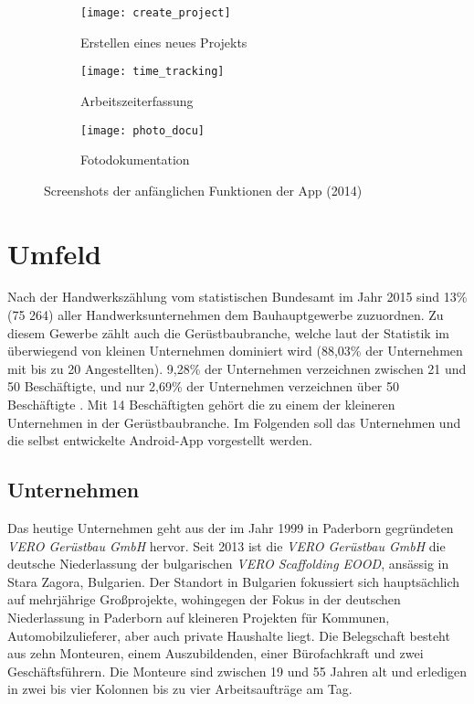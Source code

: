\begin{figure}[h]
  \centering
  \begin{subfigure}[t]{0.3\textwidth}
    \texttt{[image: create\_project]}
    \caption{Erstellen eines neues Projekts}
  \end{subfigure}
  \begin{subfigure}[t]{0.3\textwidth}
    \texttt{[image: time\_tracking]}
    \caption{Arbeitszeiterfassung}
  \end{subfigure}
  \begin{subfigure}[t]{0.3\textwidth}
    \texttt{[image: photo\_docu]}
    \caption{Fotodokumentation}
  \end{subfigure}
  \caption{Screenshots der anfänglichen Funktionen der App (2014)}
  \label{fig:app14}
\end{figure}

\section{Umfeld}
Nach der Handwerkszählung vom statistischen Bundesamt im Jahr 2015 sind 13\% (75 264) aller Handwerksunternehmen dem Bauhauptgewerbe zuzuordnen.
Zu diesem Gewerbe zählt auch die Gerüstbaubranche, welche laut der Statistik im überwiegend von kleinen Unternehmen dominiert wird (88,03\% der Unternehmen mit bis zu 20 Angestellten). 
9,28\% der Unternehmen verzeichnen zwischen 21 und 50 Beschäftigte, und nur 2,69\% der Unternehmen verzeichnen über 50 Beschäftigte \citep{HZ17}.
Mit 14 Beschäftigten gehört die \vr{} zu einem der kleineren Unternehmen in der Gerüstbaubranche.
Im Folgenden soll das Unternehmen und die selbst entwickelte Android-App vorgestellt werden.

\subsection{Unternehmen}
Das heutige Unternehmen \vr{} geht aus der im Jahr 1999 in Paderborn gegründeten \emph{VERO Gerüstbau GmbH} hervor. 
Seit 2013 ist die \emph{VERO Gerüstbau GmbH} die deutsche Niederlassung der bulgarischen \emph{VERO Scaffolding EOOD}, ansässig in Stara Zagora, Bulgarien.
Der Standort in Bulgarien fokussiert sich hauptsächlich auf mehrjährige Großprojekte, wohingegen der Fokus in der deutschen Niederlassung in Paderborn auf kleineren Projekten für Kommunen, Automobilzulieferer, aber auch private Haushalte liegt.
Die Belegschaft besteht aus zehn Monteuren, einem Auszubildenden, einer Bürofachkraft und zwei Geschäftsführern.
Die Monteure sind zwischen 19 und 55 Jahren alt und erledigen in zwei bis vier Kolonnen bis zu vier Arbeitsaufträge am Tag.

